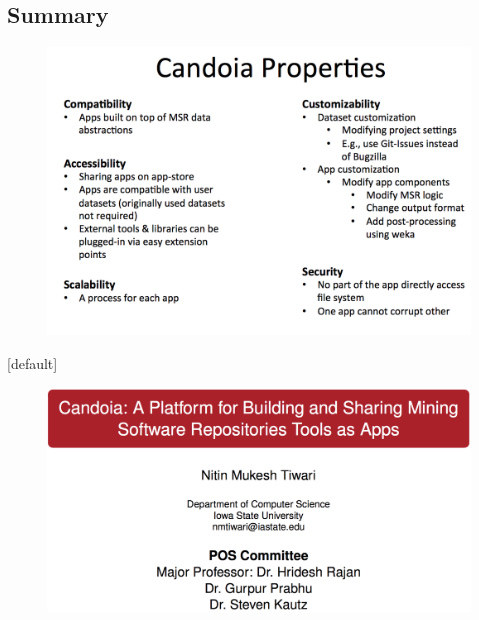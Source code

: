     \subsection{Summary}
        \begin{frame}
            \begin{figure}
                \centering
                    \includegraphics[scale=0.2]{figures/summary.png}
            \end{figure}
        \end{frame}


\makeatletter %
    [default] %
    \def\beamer@entrycode{\vspace*{-\headheight}} %
\makeatother

        \begin{frame}
                \begin{figure}
                    \centering
                    \includegraphics[scale=0.2]{figures/thankyou.png}

                \end{figure}
        \end{frame}



